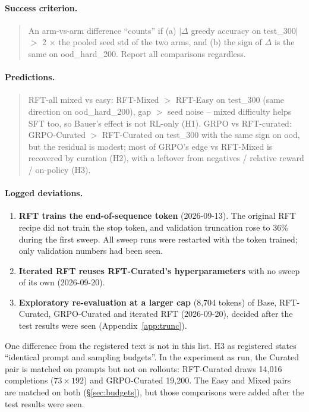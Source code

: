 \documentclass{article}
\begin{document}
\paragraph{Success criterion.}
\begin{quote}\small
An arm-vs-arm difference ``counts'' if (a) $|\Delta$ greedy accuracy on test\_300$|$ $>$ 2 $\times$ the pooled seed std of the two arms, and (b) the sign of $\Delta$ is the same on ood\_hard\_200. Report all comparisons regardless.
\end{quote}

\paragraph{Predictions.}
\begin{quote}\small
RFT-all mixed vs easy: RFT-Mixed $>$ RFT-Easy on test\_300 (same direction on ood\_hard\_200), gap $>$ seed noise -- mixed difficulty helps SFT too, so Bauer's effect is not RL-only (H1). GRPO vs RFT-curated: GRPO-Curated $>$ RFT-Curated on test\_300 with the same sign on ood, but the residual is modest; most of GRPO's edge vs RFT-Mixed is recovered by curation (H2), with a leftover from negatives / relative reward / on-policy (H3).
\end{quote}

\paragraph{Logged deviations.}
\begin{enumerate}
  \item \textbf{RFT trains the end-of-sequence token} (2026-09-13). The original RFT recipe did not train the stop token, and validation truncation rose to 36\% during the first sweep. All sweep runs were restarted with the token trained; only validation numbers had been seen.
  \item \textbf{Iterated RFT reuses RFT-Curated's hyperparameters} with no sweep of its own (2026-09-20).
  \item \textbf{Exploratory re-evaluation at a larger cap} (8{,}704 tokens) of Base, RFT-Curated, GRPO-Curated and iterated RFT (2026-09-20), decided after the test results were seen (Appendix~\ref{app:trunc}).
\end{enumerate}

One difference from the registered text is not in this list. H3 as registered states ``identical prompt and sampling budgets''. In the experiment as run, the Curated pair is matched on prompts but not on rollouts: RFT-Curated draws 14{,}016 completions ($73 \times 192$) and GRPO-Curated 19{,}200. The Easy and Mixed pairs are matched on both (\S\ref{sec:budgets}), but those comparisons were added after the test results were seen.
\end{document}
